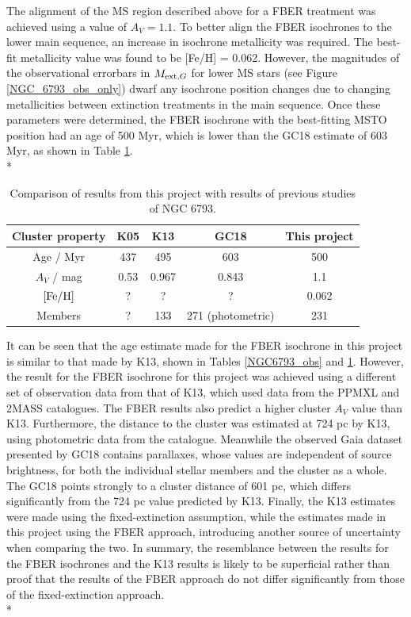 \documentclass[12pt, a4paper]{report}
\begin{document}
The alignment of the MS region described above for a FBER treatment was achieved using a value of $A_{V} = 1.1$. To better align the FBER isochrones to the lower main sequence, an increase in isochrone metallicity was required. The best-fit metallicity value was found to be [Fe/H] = 0.062. However, the magnitudes of the observational errorbars in $M_{\textnormal{ext},G}$ for lower MS stars (see Figure \ref{NGC_6793_obs_only}) dwarf any isochrone position changes due to changing metallicities between extinction treatments in the main sequence. Once these parameters were determined, the FBER isochrone with the best-fitting MSTO position had an age of 500 Myr, which is lower than the GC18 estimate of 603 Myr, as shown in Table \ref{NGC6793_result}. \\*


\begin{table}
\begin{center}
\begin{tabular}{ccccc}
\hline
Cluster property & K05 & K13 & GC18 & This project \\
\hline
Age / Myr & 437 & 495 & 603 & 500 \\
$A_{V}$ / mag & 0.53 & 0.967 & 0.843 & 1.1 \\
$\textnormal{[Fe/H]}$ & ? & ? & ? & 0.062 \\
Members & ? & 133 & 271 (photometric) & 231 \\
\hline
\end{tabular}
\caption{Comparison of results from this project with results of previous studies of NGC 6793.}
\label{NGC6793_result}
\end{center}
\end{table}

It can be seen that the age estimate made for the FBER isochrone in this project is similar to that made by K13, shown in Tables \ref{NGC6793_obs} and \ref{NGC6793_result}. However, the result for the FBER isochrone for this project was achieved using a different set of observation data from that of K13, which used data from the PPMXL and 2MASS catalogues. The FBER results also predict a higher cluster $A_{V}$ value than K13. Furthermore, the distance to the cluster was estimated at 724 pc by K13, using photometric data from the \cite{2010arXiv1012.3224H} catalogue. Meanwhile the observed Gaia dataset presented by GC18 contains parallaxes, whose values are independent of source brightness, for both the individual stellar members and the cluster as a whole. The GC18 points strongly to a cluster distance of 601 pc, which differs significantly from the 724 pc value predicted by K13. Finally, the K13 estimates were made using the fixed-extinction assumption, while the estimates made in this project using the FBER approach, introducing another source of uncertainty when comparing the two. In summary, the resemblance between the results for the FBER isochrones and the K13 results is likely to be superficial rather than proof that the results of the FBER approach do not differ significantly from those of the fixed-extinction approach.\\*
\end{document}
